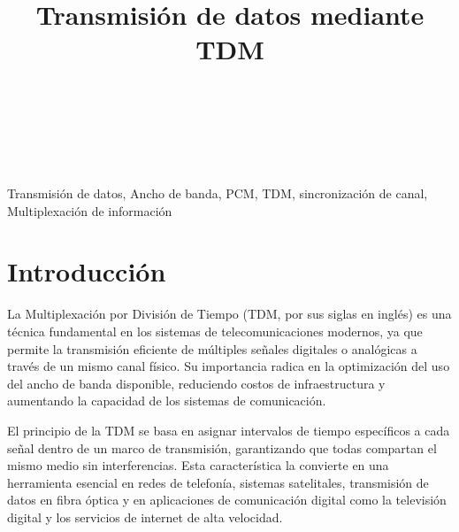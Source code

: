 \documentclass[conference]{IEEEtran}
\begin{document}
	
	\title{Transmisión de datos mediante TDM}
	\author{
		\\
		\\
		\\
		\and
		\and
	}
	
	\maketitle
	\begin{abstract}
		
	\end{abstract}
	\begin{IEEEkeywords}
		Transmisión de datos, Ancho de banda, PCM, TDM, sincronización de canal, Multiplexación de información
	\end{IEEEkeywords}
	
	\section{\textbf{Introducción}}
	
	La Multiplexación por División de Tiempo (TDM, por sus siglas en inglés) es una técnica fundamental en los sistemas de telecomunicaciones modernos, ya que permite la transmisión eficiente de múltiples señales digitales o analógicas a través de un mismo canal físico. Su importancia radica en la optimización del uso del ancho de banda disponible, reduciendo costos de infraestructura y aumentando la capacidad de los sistemas de comunicación.
	
	El principio de la TDM se basa en asignar intervalos de tiempo específicos a cada señal dentro de un marco de transmisión, garantizando que todas compartan el mismo medio sin interferencias. Esta característica la convierte en una herramienta esencial en redes de telefonía, sistemas satelitales, transmisión de datos en fibra óptica y en aplicaciones de comunicación digital como la televisión digital y los servicios de internet de alta velocidad.
	
\end{document}
